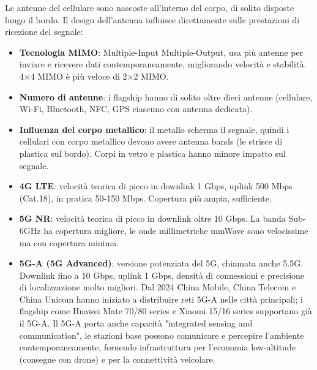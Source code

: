 
Le antenne del cellulare sono nascoste all'interno del corpo, di solito disposte lungo il bordo. Il design dell'antenna influisce direttamente sulle prestazioni di ricezione del segnale:

\begin{itemize}
  \item \textbf{Tecnologia MIMO}: Multiple-Input Multiple-Output, usa più antenne per inviare e ricevere dati contemporaneamente, migliorando velocità e stabilità. 4×4 MIMO è più veloce di 2×2 MIMO.
  \item \textbf{Numero di antenne}: i flagship hanno di solito oltre dieci antenne (cellulare, Wi-Fi, Bluetooth, NFC, GPS ciascuno con antenna dedicata).
  \item \textbf{Influenza del corpo metallico}: il metallo scherma il segnale, quindi i cellulari con corpo metallico devono avere antenna bands (le strisce di plastica sul bordo). Corpi in vetro e plastica hanno minore impatto sul segnale.
\end{itemize}


\begin{itemize}
  \item \textbf{4G LTE}: velocità teorica di picco in downlink 1 Gbps, uplink 500 Mbps (Cat.18), in pratica 50-150 Mbps. Copertura più ampia, sufficiente.
  \item \textbf{5G NR}: velocità teorica di picco in downlink oltre 10 Gbps. La banda Sub-6GHz ha copertura migliore, le onde millimetriche mmWave sono velocissime ma con copertura minima.
  \item \textbf{5G-A (5G Advanced)}: versione potenziata del 5G, chiamata anche 5.5G. Downlink fino a 10 Gbps, uplink 1 Gbps, densità di connessioni e precisione di localizzazione molto migliori. Dal 2024 China Mobile, China Telecom e China Unicom hanno iniziato a distribuire reti 5G-A nelle città principali; i flagship come Huawei Mate 70/80 series e Xiaomi 15/16 series supportano già il 5G-A. Il 5G-A porta anche capacità "integrated sensing and communication", le stazioni base possono comunicare e percepire l'ambiente contemporaneamente, fornendo infrastruttura per l'economia low-altitude (consegne con drone) e per la connettività veicolare.
\end{itemize}


